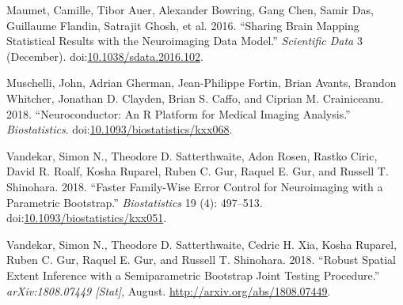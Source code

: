 \documentclass[]{article}
\begin{document}
\hypertarget{ref-maumet_sharing_2016}{}
Maumet, Camille, Tibor Auer, Alexander Bowring, Gang Chen, Samir Das,
Guillaume Flandin, Satrajit Ghosh, et al. 2016. ``Sharing Brain Mapping
Statistical Results with the Neuroimaging Data Model.'' \emph{Scientific
Data} 3 (December).
doi:\href{https://doi.org/10.1038/sdata.2016.102}{10.1038/sdata.2016.102}.

\hypertarget{ref-muschelli_neuroconductor:_2018}{}
Muschelli, John, Adrian Gherman, Jean-Philippe Fortin, Brian Avants,
Brandon Whitcher, Jonathan D. Clayden, Brian S. Caffo, and Ciprian M.
Crainiceanu. 2018. ``Neuroconductor: An R Platform for Medical Imaging
Analysis.'' \emph{Biostatistics}.
doi:\href{https://doi.org/10.1093/biostatistics/kxx068}{10.1093/biostatistics/kxx068}.

\hypertarget{ref-vandekar_faster_2018}{}
Vandekar, Simon N., Theodore D. Satterthwaite, Adon Rosen, Rastko Ciric,
David R. Roalf, Kosha Ruparel, Ruben C. Gur, Raquel E. Gur, and Russell
T. Shinohara. 2018. ``Faster Family-Wise Error Control for Neuroimaging
with a Parametric Bootstrap.'' \emph{Biostatistics} 19 (4): 497--513.
doi:\href{https://doi.org/10.1093/biostatistics/kxx051}{10.1093/biostatistics/kxx051}.

\hypertarget{ref-vandekar_robust_2018}{}
Vandekar, Simon N., Theodore D. Satterthwaite, Cedric H. Xia, Kosha
Ruparel, Ruben C. Gur, Raquel E. Gur, and Russell T. Shinohara. 2018.
``Robust Spatial Extent Inference with a Semiparametric Bootstrap Joint
Testing Procedure.'' \emph{arXiv:1808.07449 {[}Stat{]}}, August.
\url{http://arxiv.org/abs/1808.07449}.
\end{document}
